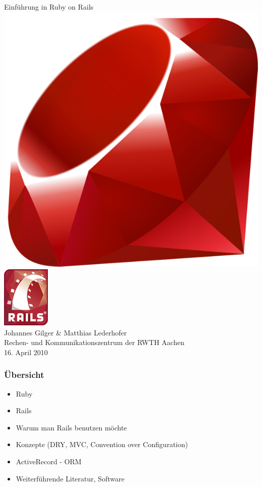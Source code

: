 \begin{frame}
  \begin{center}
    \vspace*{\fill}
    \Huge Einführung in Ruby on Rails \\
    \vspace{0.8cm}
    \includegraphics[scale=2]{img/ruby-logo.png} \enskip
    \includegraphics[scale=0.6]{img/rails-logo.png} \\
    \vspace{0.6cm}
    \Large Johannes Gilger \& Matthias Lederhofer \\
    \small Rechen- und Kommunikationszentrum der RWTH Aachen \\
    \vspace{1cm}
    \small 16. April 2010
    \vspace*{\fill}
  \end{center}
\end{frame}

\begin{frame}
  \frametitle{Übersicht}
  \begin{itemize}
    \item Ruby
    \item Rails
    \item Warum man Rails benutzen möchte
    \item Konzepte (DRY, MVC, Convention over Configuration)
    \item ActiveRecord - ORM
    \item Weiterführende Literatur, Software
  \end{itemize}
\end{frame}



